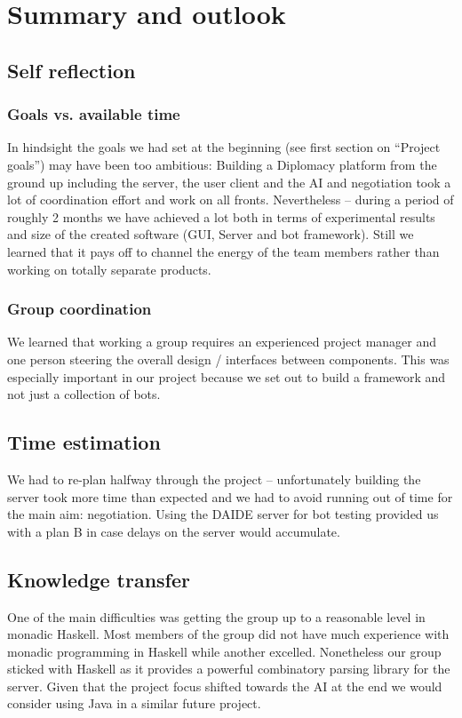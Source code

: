 \documentclass[pdftex,11pt,a4paper]{report}
\begin{document}
\pagebreak

\chapter{Summary and outlook}

\section{Self reflection}

\subsection{Goals vs. available time}
In hindsight the goals we had set at the beginning (see first section
on ``Project goals'') may have been too ambitious: Building a
Diplomacy platform from the ground up including the server, the user
client and the AI and negotiation took a lot of coordination effort
and work on all fronts. Nevertheless -- during a period of roughly 2 months
we have achieved a lot both in terms of experimental results and size
of the created software (GUI, Server and bot framework). Still we 
learned that it pays off to channel the energy of the team members 
rather than working on totally separate products.

\subsection{Group coordination} 
We learned that working a group requires an experienced project
manager and one person steering the overall design / interfaces
between components. This was especially important in our project 
because we set out to build a framework and not just a collection
of bots.

\section{Time estimation}
We had to re-plan halfway through the project -- unfortunately
building the server took more time than expected and
we had to avoid running out of time for the main aim: 
negotiation. Using the DAIDE server for bot testing provided
us with a plan B in case delays on the server would accumulate.

\section{Knowledge transfer}
One of the main difficulties was getting the group up to a reasonable
level in monadic Haskell. Most members of the group did not have much
experience with monadic programming in Haskell while another excelled.
Nonetheless our group sticked with Haskell as it provides a 
powerful combinatory parsing library \cite{ParsecLib} for the server.
Given that the project focus shifted towards the AI at the end we 
would consider using Java in a similar future project. \\
\end{document}

